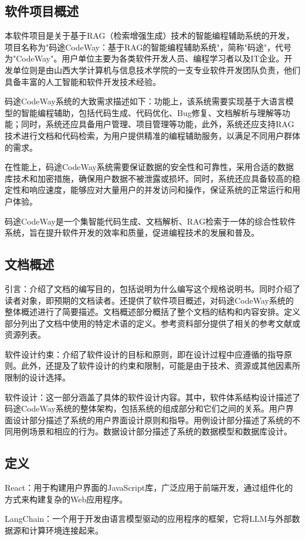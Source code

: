 \documentclass[
    report,     %
    oneside,    %
    UTF8,       %
    zihao=-4    %
]{config} %
\begin{document}
\subsection{软件项目概述}
本软件项目是关于基于RAG（检索增强生成）技术的智能编程辅助系统的开发，项目名称为"码途CodeWay：基于RAG的智能编程辅助系统"，简称"码途"，代号为"CodeWay"。用户单位主要为各类软件开发人员、编程学习者以及IT企业。开发单位则是由山西大学计算机与信息技术学院的一支专业软件开发团队负责，他们具备丰富的人工智能和软件开发技术经验。

码途CodeWay系统的大致需求描述如下：功能上，该系统需要实现基于大语言模型的智能编程辅助，包括代码生成、代码优化、Bug修复、文档解析与理解等功能；同时，系统还应具备用户管理、项目管理等功能，此外，系统还应支持RAG技术进行文档和代码检索，为用户提供精准的编程辅助服务，以满足不同用户群体的需求。

在性能上，码途CodeWay系统需要保证数据的安全性和可靠性，采用合适的数据库技术和加密措施，确保用户数据不被泄露或损坏。同时，系统还应具备较高的稳定性和响应速度，能够应对大量用户的并发访问和操作，保证系统的正常运行和用户体验。

码途CodeWay是一个集智能代码生成、文档解析、RAG检索于一体的综合性软件系统，旨在提升软件开发的效率和质量，促进编程技术的发展和普及。
\subsection{文档概述}
引言：介绍了文档的编写目的，包括说明为什么编写这个规格说明书。同时介绍了读者对象，即预期的文档读者。还提供了软件项目概述，对码途CodeWay系统的整体概述进行了简要描述。文档概述部分概括了整个文档的结构和内容安排。定义部分列出了文档中使用的特定术语的定义。参考资料部分提供了相关的参考文献或资源列表。

软件设计约束：介绍了软件设计的目标和原则，即在设计过程中应遵循的指导原则。此外，还提及了软件设计的约束和限制，可能是由于技术、资源或其他因素所限制的设计选择。

软件设计：这一部分涵盖了具体的软件设计内容。其中，软件体系结构设计描述了码途CodeWay系统的整体架构，包括系统的组成部分和它们之间的关系。用户界面设计部分描述了系统的用户界面设计原则和指导。用例设计部分描述了系统的不同用例场景和相应的行为。数据设计部分描述了系统的数据模型和数据库设计。
\subsection{定义}
React：用于构建用户界面的JavaScript库，广泛应用于前端开发，通过组件化的方式来构建复杂的Web应用程序。

LangChain：一个用于开发由语言模型驱动的应用程序的框架，它将LLM与外部数据源和计算环境连接起来。
\end{document}
